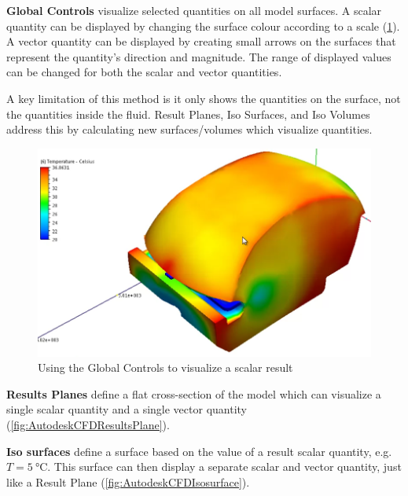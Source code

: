 \textbf{Global Controls}\cite[Global Controls]{AutodeskCFDManual} visualize selected quantities on all model surfaces.
A scalar quantity can be displayed by changing the surface colour according to a scale (\cref{fig:AutodeskCFDGlobalControlsScalar}).
A vector quantity can be displayed by creating small arrows on the surfaces that represent the quantity's direction and magnitude.
The range of displayed values can be changed for both the scalar and vector quantities.

A key limitation of this method is it only shows the quantities on the surface, not the quantities inside the fluid.
Result Planes, Iso Surfaces, and Iso Volumes address this by calculating new surfaces/volumes which visualize quantities.

\begin{figure}
    \centering
    \includegraphics[width=\linewidth]{Ch20Research/figures/autodesk_cfd_global_results_scalar.PNG}
    \caption{Using the Global Controls to visualize a scalar result\cite{AutodeskCFDExercise7}}
    \label{fig:AutodeskCFDGlobalControlsScalar}
\end{figure}

\textbf{Results Planes}\cite[Planes]{AutodeskCFDManual} define a flat cross-section of the model which can visualize a single scalar quantity and a single vector quantity (\cref{fig:AutodeskCFDResultsPlane}).

\textbf{Iso surfaces} define a surface based on the value of a result scalar quantity, e.g. $T = \SI{5}{\celsius}$.
This surface can then display a separate scalar and vector quantity, just like a Result Plane (\cref{fig:AutodeskCFDIsosurface}).

